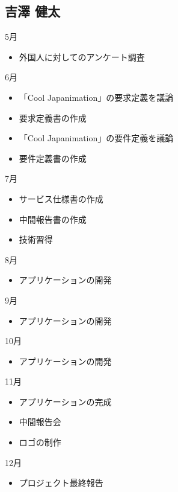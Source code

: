 \subsection{吉澤 健太}
5月
\begin{itemize}
\item 外国人に対してのアンケート調査
\end{itemize}
6月
\begin{itemize}
\item 「Cool Japanimation」の要求定義を議論
\item 要求定義書の作成
\item 「Cool Japanimation」の要件定義を議論
\item 要件定義書の作成
\end{itemize}
7月
\begin{itemize}
\item サービス仕様書の作成
\item 中間報告書の作成
\item 技術習得
\end{itemize}
8月
\begin{itemize}
\item アプリケーションの開発
\end{itemize}
9月
\begin{itemize}
\item アプリケーションの開発
\end{itemize}
10月
\begin{itemize}
\item アプリケーションの開発
\end{itemize}
11月
\begin{itemize}
\item アプリケーションの完成
\item 中間報告会
\item ロゴの制作
\end{itemize}
12月
\begin{itemize}
\item プロジェクト最終報告
\end{itemize}
